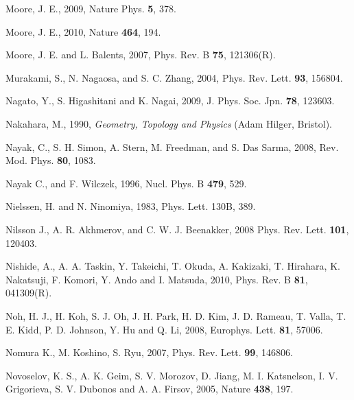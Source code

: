 \documentclass[twocolumn,floatfix,showpacs,rmp,aps]{revtex4}
\begin{document}
\begin{thebibliography}{99}
		Moore, J. E., 2009,
		Nature Phys. {\bf 5}, 378.
		
		Moore, J. E., 2010, Nature {\bf 464}, 194.
		
		Moore, J. E. and L. Balents, 2007,
		Phys. Rev. B {\bf 75}, 121306(R).
		
		Murakami, S., N. Nagaosa, and S. C. Zhang, 2004,
		Phys. Rev. Lett. {\bf 93}, 156804.
		
		Nagato, Y., S. Higashitani and K. Nagai, 2009,
		J. Phys. Soc. Jpn. {\bf 78}, 123603.
		
		Nakahara, M., 1990,
		{\it Geometry, Topology and Physics} (Adam Hilger, Bristol).
		
		Nayak, C., S. H. Simon, A. Stern, M. Freedman, and S. Das Sarma, 2008,
		Rev. Mod. Phys. {\bf 80}, 1083.
		
		Nayak C., and F. Wilczek, 1996,
		Nucl. Phys. B {\bf 479}, 529.
		
		Nielssen, H. and N. Ninomiya, 1983,
		Phys. Lett. 130B, 389.
		
		Nilsson J., A. R. Akhmerov, and C. W. J. Beenakker, 2008
		Phys. Rev. Lett. {\bf 101}, 120403.
		
		Nishide, A., A. A. Taskin, Y. Takeichi, T. Okuda, A. Kakizaki, T. Hirahara,
		K. Nakatsuji, F. Komori, Y. Ando and I. Matsuda, 2010,
		Phys. Rev. B {\bf 81}, 041309(R).
		
		Noh, H. J., H. Koh, S. J. Oh, J. H. Park, H. D. Kim, J. D. Rameau, T. Valla,
		T. E. Kidd, P. D. Johnson, Y. Hu and Q. Li, 2008,
		Europhys. Lett. {\bf 81}, 57006.
		
		Nomura K., M. Koshino, S. Ryu, 2007,
		Phys. Rev. Lett. {\bf 99}, 146806.
		
		Novoselov, K. S., A. K. Geim, S. V. Morozov, D. Jiang, M. I. Katsnelson,
		I. V. Grigorieva, S. V. Dubonos and A. A. Firsov, 2005,
		Nature {\bf 438}, 197.
		

\end{thebibliography}
\end{document}
